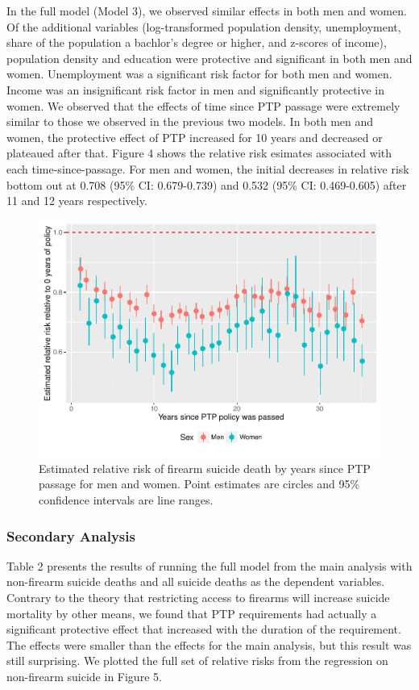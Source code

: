 \documentclass[]{article}
\begin{document}
In the full model (Model 3), we observed similar effects in both men and
women. Of the additional variables (log-transformed population density,
unemployment, share of the population a bachlor's degree or higher, and
z-scores of income), population density and education were protective
and significant in both men and women. Unemployment was a significant
risk factor for both men and women. Income was an insignificant risk
factor in men and significantly protective in women. We observed that
the effects of time since PTP passage were extremely similar to those we
observed in the previous two models. In both men and women, the
protective effect of PTP increased for 10 years and decreased or
plateaued after that. Figure 4 shows the relative risk esimates
associated with each time-since-passage. For men and women, the initial
decreases in relative risk bottom out at 0.708 (95\% CI: 0.679-0.739)
and 0.532 (95\% CI: 0.469-0.605) after 11 and 12 years respectively.

\begin{figure}[htbp]
\centering
\includegraphics{Thesis_files/figure-latex/RR-plot-1.pdf}
\caption{Estimated relative risk of firearm suicide death by years since
PTP passage for men and women. Point estimates are circles and 95\%
confidence intervals are line ranges.}
\end{figure}

\subsubsection{Secondary Analysis}\label{secondary-analysis}

Table 2 presents the results of running the full model from the main
analysis with non-firearm suicide deaths and all suicide deaths as the
dependent variables. Contrary to the theory that restricting access to
firearms will increase suicide mortality by other means, we found that
PTP requirements had actually a significant protective effect that
increased with the duration of the requirement. The effects were smaller
than the effects for the main analysis, but this result was still
surprising. We plotted the full set of relative risks from the
regression on non-firearm suicide in Figure 5.
\end{document}
